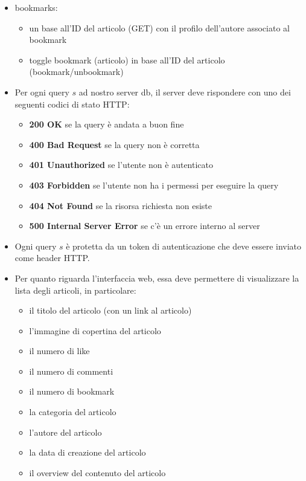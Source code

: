 \documentclass{article}
\begin{document}
\begin{itemize}
        \item bookmarks:
        \begin{itemize}
            \item un base all'ID del articolo (GET) con il profilo dell'autore associato al bookmark
            \item toggle bookmark (articolo) in base all'ID del articolo (bookmark/unbookmark)
        \end{itemize}
        \item Per ogni query $s$ ad nostro server db, il server deve rispondere con uno dei seguenti codici di stato HTTP:
        \begin{itemize}
            \item \textbf{200 OK} se la query è andata a buon fine
            \item \textbf{400 Bad Request} se la query non è corretta
            \item \textbf{401 Unauthorized} se l'utente non è autenticato
            \item \textbf{403 Forbidden} se l'utente non ha i permessi per eseguire la query
            \item \textbf{404 Not Found} se la risorsa richiesta non esiste
            \item \textbf{500 Internal Server Error} se c'è un errore interno al server
        \end{itemize}
        \item Ogni query $s$ è protetta da un token di autenticazione che deve essere inviato come header HTTP.
        \item Per quanto riguarda l'interfaccia web, essa deve permettere di visualizzare la lista degli articoli, in particolare:
        \begin{itemize}
            \item il titolo del articolo (con un link al articolo)
            \item l'immagine di copertina del articolo
            \item il numero di like
            \item il numero di commenti
            \item il numero di bookmark
            \item la categoria del articolo
            \item l'autore del articolo
            \item la data di creazione del articolo
            \item il overview del contenuto del articolo

\end{itemize}
\end{itemize}
\end{document}
